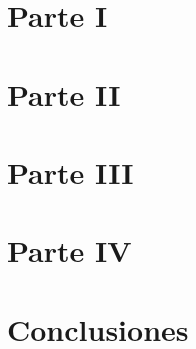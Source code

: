 







\tableofcontents
\newpage



\section{Parte I}


\section{Parte II}
\label{sec_parteii}


\section{Parte III}


\section{Parte IV}

\section{Conclusiones}



